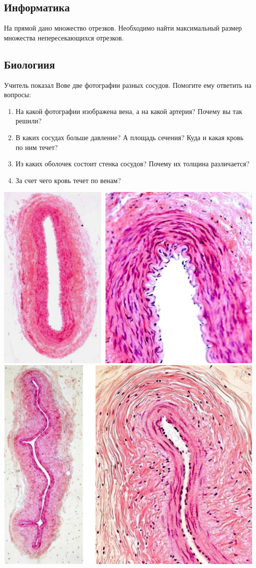 \documentclass[a4paper, 12pt]{article}
\begin{document}
	 \subsection*{Информатика}
	 На прямой дано множество отрезков. Необходимо найти максимальный размер множества непересекающихся отрезков.
	 \subsection*{Биологиия}
	 Учитель показал Вове две фотографии разных сосудов. Помогите ему ответить на вопросы:
	 \begin{enumerate}
	 \item На какой фотографии изображена вена, а на какой артерия? Почему вы так решили?
	 \item В каких сосудах больше давление? А площадь сечения? Куда и какая кровь по ним течет?
	 \item Из каких оболочек состоит стенка сосудов? Почему их толщина различается?
	 \item За счет чего кровь течет по венам? 
	 \end{enumerate}
	 \includegraphics[scale=0.7]{1}\\
	 \includegraphics[scale=0.7]{2}
\end{document}
